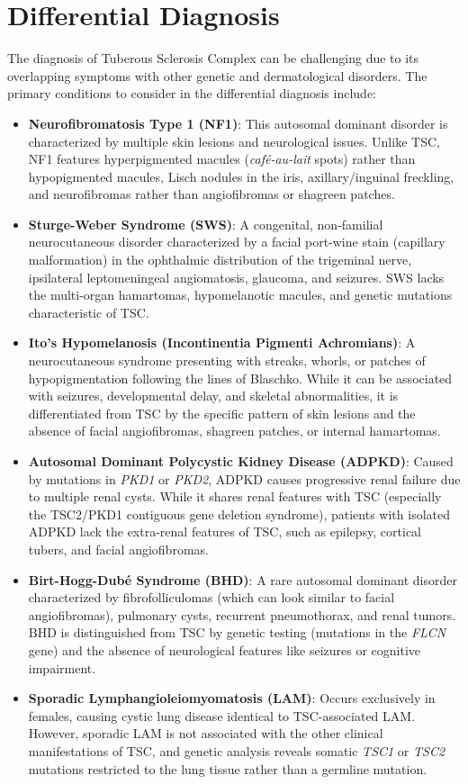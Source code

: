 \section*{Differential Diagnosis}
The diagnosis of Tuberous Sclerosis Complex can be challenging due to its overlapping symptoms with other genetic and dermatological disorders. The primary conditions to consider in the differential diagnosis include:
\begin{itemize}
    \item \textbf{Neurofibromatosis Type 1 (NF1)}: This autosomal dominant disorder is characterized by multiple skin lesions and neurological issues. Unlike TSC, NF1 features hyperpigmented macules (\textit{caf\'e-au-lait} spots) rather than hypopigmented macules, Lisch nodules in the iris, axillary/inguinal freckling, and neurofibromas rather than angiofibromas or shagreen patches.
    \item \textbf{Sturge-Weber Syndrome (SWS)}: A congenital, non-familial neurocutaneous disorder characterized by a facial port-wine stain (capillary malformation) in the ophthalmic distribution of the trigeminal nerve, ipsilateral leptomeningeal angiomatosis, glaucoma, and seizures. SWS lacks the multi-organ hamartomas, hypomelanotic macules, and genetic mutations characteristic of TSC.
    \item \textbf{Ito's Hypomelanosis (Incontinentia Pigmenti Achromians)}: A neurocutaneous syndrome presenting with streaks, whorls, or patches of hypopigmentation following the lines of Blaschko. While it can be associated with seizures, developmental delay, and skeletal abnormalities, it is differentiated from TSC by the specific pattern of skin lesions and the absence of facial angiofibromas, shagreen patches, or internal hamartomas.
    \item \textbf{Autosomal Dominant Polycystic Kidney Disease (ADPKD)}: Caused by mutations in \textit{PKD1} or \textit{PKD2}, ADPKD causes progressive renal failure due to multiple renal cysts. While it shares renal features with TSC (especially the TSC2/PKD1 contiguous gene deletion syndrome), patients with isolated ADPKD lack the extra-renal features of TSC, such as epilepsy, cortical tubers, and facial angiofibromas.
    \item \textbf{Birt-Hogg-Dub\'e Syndrome (BHD)}: A rare autosomal dominant disorder characterized by fibrofolliculomas (which can look similar to facial angiofibromas), pulmonary cysts, recurrent pneumothorax, and renal tumors. BHD is distinguished from TSC by genetic testing (mutations in the \textit{FLCN} gene) and the absence of neurological features like seizures or cognitive impairment.
    \item \textbf{Sporadic Lymphangioleiomyomatosis (LAM)}: Occurs exclusively in females, causing cystic lung disease identical to TSC-associated LAM. However, sporadic LAM is not associated with the other clinical manifestations of TSC, and genetic analysis reveals somatic \textit{TSC1} or \textit{TSC2} mutations restricted to the lung tissue rather than a germline mutation.
\end{itemize}

